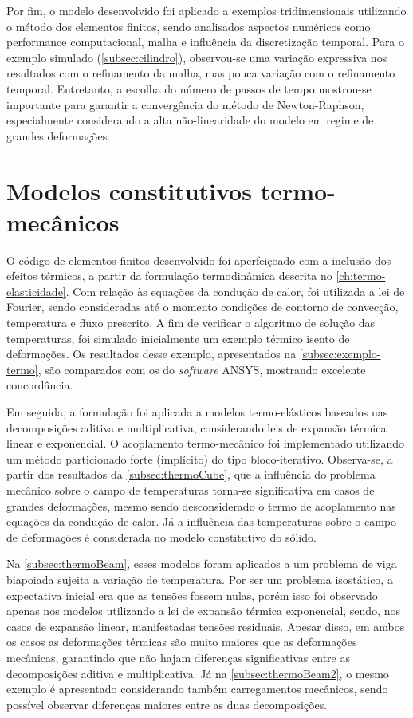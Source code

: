 \documentclass[Relatorio-FAPESP-2020.tex]{subfiles}
\begin{document}
Por fim, o modelo desenvolvido foi aplicado a exemplos tridimensionais utilizando o método dos elementos finitos, sendo analisados aspectos numéricos como performance computacional, malha e influência da discretização temporal. Para o exemplo simulado (\autoref{subsec:cilindro}), observou-se uma variação expressiva nos resultados com o refinamento da malha, mas pouca variação com o refinamento temporal. Entretanto, a escolha do número de passos de tempo mostrou-se importante para garantir a convergência do método de Newton-Raphson, especialmente considerando a alta não-linearidade do modelo em regime de grandes deformações.

\section{Modelos constitutivos termo-mecânicos}

O código de elementos finitos desenvolvido foi aperfeiçoado com a inclusão dos efeitos térmicos, a partir da formulação termodinâmica descrita no \autoref{ch:termo-elasticidade}. Com relação às equações da condução de calor, foi utilizada a lei de Fourier, sendo consideradas até o momento condições de contorno de convecção, temperatura e fluxo prescrito. A fim de verificar o algoritmo de solução das temperaturas, foi simulado inicialmente um exemplo térmico isento de deformações. Os resultados desse exemplo, apresentados na \autoref{subsec:exemplo-termo}, são comparados com os do \emph{software} ANSYS, mostrando excelente concordância.

Em seguida, a formulação foi aplicada a modelos termo-elásticos baseados nas decomposições aditiva e multiplicativa, considerando leis de expansão térmica linear e exponencial. O acoplamento termo-mecânico foi implementado utilizando um método particionado forte (implícito) do tipo bloco-iterativo. Observa-se, a partir dos resultados da \autoref{subsec:thermoCube}, que a influência do problema mecânico sobre o campo de temperaturas torna-se significativa em casos de grandes deformações, mesmo sendo desconsiderado o termo de acoplamento nas equações da condução de calor. Já a influência das temperaturas sobre o campo de deformações é considerada no modelo constitutivo do sólido.

Na \autoref{subsec:thermoBeam}, esses modelos foram aplicados a um problema de viga biapoiada sujeita a variação de temperatura. Por ser um problema isostático, a expectativa inicial era que as tensões fossem nulas, porém isso foi observado apenas nos modelos utilizando a lei de expansão térmica exponencial, sendo, nos casos de expansão linear, manifestadas tensões residuais. Apesar disso, em ambos os casos as deformações térmicas são muito maiores que as deformações mecânicas, garantindo que não hajam diferenças significativas entre as decomposições aditiva e multiplicativa. Já na \autoref{subsec:thermoBeam2}, o mesmo exemplo é apresentado considerando também carregamentos mecânicos, sendo possível observar diferenças maiores entre as duas decomposições.
\end{document}

